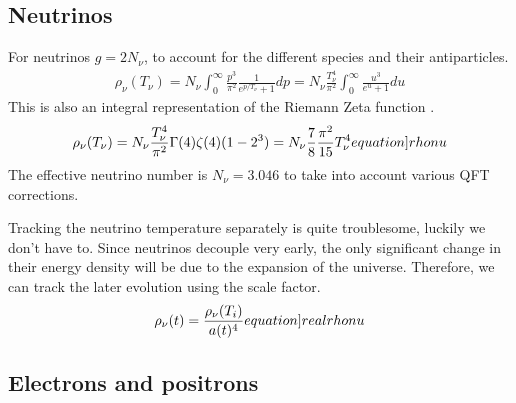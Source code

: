 \subsection{Neutrinos}

For neutrinos $g=2N_\nu$, to account for the different species and their antiparticles.
\begin{align}
    \rho_\nu(T_\nu)=N_\nu\int_{0}^{\infty} \frac{p^3}{\pi^2}\frac{1}{e^{p/T_\nu}+1}dp =  N_\nu\frac{T_\nu^4}{\pi^2}\int_{0}^{\infty}\frac{u^3}{e^{u}+1}du
\end{align}
This is also an integral representation of the Riemann Zeta function \cite[\href{https://dlmf.nist.gov/25.5.E3}{(25.5.3)}]{NIST:DLMF}.
\begin{align}
    \rho_\nu(T_\nu)=N_\nu\frac{T_\nu^4}{\pi^2}\Gamma(4)\zeta(4)(1-2^3)=N_\nu\frac{7}{8}\frac{\pi^2}{15}T_\nu^4
    \label[equation]{rhonu}
\end{align}
The effective neutrino number is $N_\nu=3.046$ to take into account various QFT corrections\cite{Mangano_2005}.

Tracking the neutrino temperature separately is quite troublesome, luckily we don't have to. Since neutrinos decouple very early, the only significant change in their energy density will be due to the expansion of the universe. Therefore, we can track the later evolution using the scale factor.
\begin{align}
    \rho_\nu(t)=\frac{\rho_\nu(T_i)}{a(t)^4}
    \label[equation]{realrhonu}
\end{align}



\subsection{Electrons and positrons}



